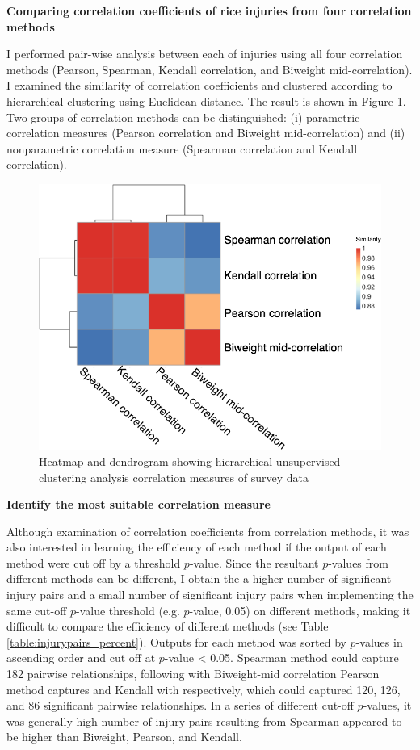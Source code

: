 \textbf{Comparing correlation coefficients of rice injuries from four correlation methods }

I performed pair-wise analysis between each of injuries using all four correlation methods (Pearson, Spearman, Kendall correlation, and Biweight mid-correlation). I examined the similarity of correlation coefficients and clustered according to hierarchical clustering using Euclidean distance. The result is shown in Figure \ref{fig:heatmap}. Two groups of correlation methods can be distinguished: (i) parametric correlation measures (Pearson correlation and Biweight mid-correlation) and (ii) nonparametric correlation measure (Spearman correlation and Kendall correlation).
\begin{figure}[!h]
\centering
\includegraphics[width = 1\textwidth]{figures/heatmap/heatmap.png}
\caption{Heatmap and dendrogram showing hierarchical unsupervised clustering analysis correlation measures of survey data}
\label{fig:heatmap}
\end{figure}

\textbf{Identify the most suitable correlation measure}

Although examination of correlation coefficients from correlation methods, it was also interested in learning the efficiency of each method if the output of each method were cut off by a threshold $p$-value. Since the resultant $p$-values from different methods can be different, I obtain the a higher number of significant injury pairs and a small number of significant injury pairs when implementing the same cut-off $p$-value threshold (e.g. $p$-value, 0.05) on different methods, making it difficult to compare the efficiency of different methods (see Table \ref{table:injurypairs_percent}). Outputs for each method was sorted by $p$-values in ascending order and cut off at $p$-value < 0.05.  Spearman method could capture 182 pairwise relationships, following with Biweight-mid correlation Pearson method captures and Kendall with respectively, which could captured 120, 126, and 86 significant pairwise relationships. In a series of different cut-off $p$-values, it was generally high number of injury pairs resulting from Spearman appeared to be higher than Biweight, Pearson, and Kendall.

